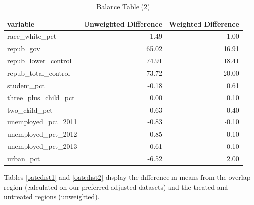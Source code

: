 \documentclass[12pt]{article}
\begin{document}
\begin{table}[ht]
\centering
\begin{tabular}{lrr}
  \hline
variable & Unweighted Difference & Weighted Difference \\ 
  \hline
  race\_white\_pct & 1.49 & -1.00 \\ 
  repub\_gov & 65.02 & 16.91 \\ 
  repub\_lower\_control & 74.91 & 18.41 \\ 
  repub\_total\_control & 73.72 & 20.00 \\ 
  student\_pct & -0.18 & 0.61 \\ 
  three\_plus\_child\_pct & 0.00 & 0.10 \\ 
  two\_child\_pct & -0.63 & 0.40 \\ 
  unemployed\_pct\_2011 & -0.83 & -0.10 \\ 
  unemployed\_pct\_2012 & -0.85 & 0.10 \\ 
  unemployed\_pct\_2013 & -0.61 & 0.10 \\ 
  urban\_pct & -6.52 & 2.00 \\ 
   \hline
\end{tabular}
\caption{Balance Table (2)}
\label{baltab2}
\end{table}

Tables \ref{oatedist1} and \ref{oatedist2} display the difference in means from the overlap region (calculated on our preferred adjusted datasets) and the treated and untreated regions (unweighted). 
\end{document}
